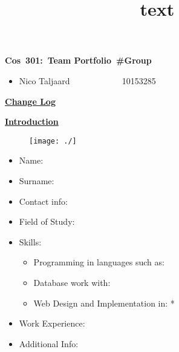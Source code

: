 \documentclass[12pt]{article}
\newcommand{\Title}{Team Portfolio\ \#Group } %
\newcommand{\Class}{Cos\ 301} %
\begin{document}
\title{text}
	\vspace{2in}
	\hspace{1.5in}
	\textmd{\textbf{\Class:\ \Title}}\\
	\vspace{1.5in}


\begin{itemize} %
	\item Nico Taljaard \ ~~~~~~~~~ \ 10153285
	
\end{itemize}

\newpage
\textbf{\underline{Change Log}}



\newpage
\textbf{\underline{Introduction}}


\newpage %
\begin{figure}[htbp]
	\centering
	\texttt{[image: ./]}
\end{figure}

\begin{itemize}
	\item Name: \ ~~~~~~~~~~~~~~~ \ 
	\item Surname: \ ~~~~~~~~~~~ \ 
	\item Contact info: \ ~~~~~~ \  \newline 
	\item Field of Study: \ ~~~~ \ 
	\item Skills: \begin{itemize}
					\item Programming in languages such as: 
					\item Database work with: 
					\item Web Design and Implementation in:    * %
				  \end{itemize}
	\item Work Experience: \  \ 
	\item Additional Info: \ ~~ \ 
	
\end{itemize}
\end{document}
